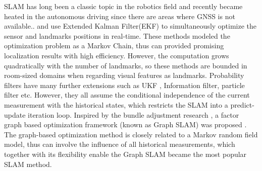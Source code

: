 \documentclass[journal]{IEEEtran}
\begin{document}
SLAM has long been a classic topic in the robotics field\citep{Cadena:2016fp} and recently became heated in the autonomous driving since there are areas where GNSS is not available.\citep{Bansal2015Analysis}. 
\citet{Davison2003Real} \citet{Davison2007MonoSLAM} and \citet{Civera20101} use Extended Kalman Filter(EKF) to simultaneously optimize the sensor and landmarks positions in real-time. 
These methods modeled the optimization problem as a Markov Chain, thus can provided promising localization results with high efficiency.
However, the computation grows quadratically with the number of landmarks\cite{Bailey2006Simultaneous}, so these methods are bounded in room-sized domains when regarding visual features as landmarks.
Probability filters have many further extensions such as UKF \citep{martinez2005unscented}, Information filter\citep{thrun2005multi}, particle filter\citep{montemerlo2007fastslam}\citep{montemerlo2002fastslam} etc.
However, they all assume the conditional independence of the current measurement with the historical states, which restricts the SLAM into a predict-update iteration loop.
Inspired by the bundle adjustment research \citep{}, a factor graph based optimization framework (known as Graph SLAM) was proposed \citep{}.
The graph-based optimization method is closely related to a Markov random field model, thus can involve the influence of all historical measurements, which together with its flexibility enable the Graph SLAM became the most popular SLAM method\citep{why filters}.  

\end{document}
